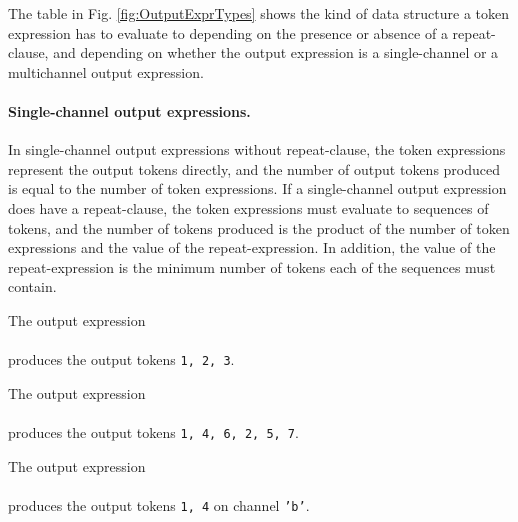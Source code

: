 
The table in Fig. \ref{fig:OutputExprTypes} shows the kind of data
structure a token expression has to evaluate to depending on the
presence or absence of a repeat-clause, and depending on whether the
output expression is a single-channel or a multichannel output
expression.


\paragraph{Single-channel output expressions.} 
In single-channel output expressions without repeat-clause, the token
expressions represent the output tokens directly, and the number of
output tokens produced is equal to the number of token expressions. If
a single-channel output expression does have a repeat-clause, the
token expressions must evaluate to sequences of tokens, and the number
of tokens produced
is the product of the number of token expressions and the value of the
repeat-expression. In addition, the value of the repeat-expression is
the minimum number of tokens each of the sequences must contain.

\begin{example}
  The output expression\\
  \\
  produces the output tokens {\tt 1, 2, 3}.

  The output expression\\
  \\
  produces the output tokens {\tt 1, 4, 6, 2, 5, 7}.

  The output expression\\
  \\
  produces the output tokens {\tt 1, 4} on channel {\tt 'b'}.
\end{example}

